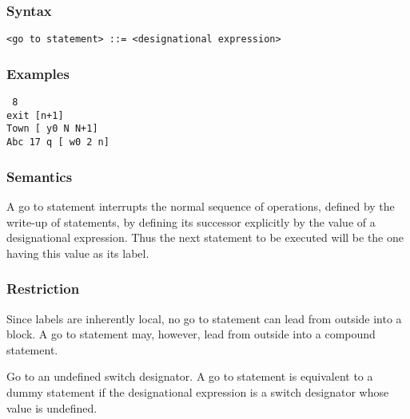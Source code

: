 \documentclass[a4paper,11pt]{article}
\begin{document}
\subsubsection{Syntax}
\label{LblGotoStatementsSyntax}

\begin{flushleft}
\vspace{0.2em}\texttt{<go to statement> ::=  <designational expression>}\\
\end{flushleft}


\subsubsection{Examples}

\begin{flushleft}
\texttt{ 8\\
 exit [n+1]\\
 Town [ y\mlt{}0  N  N+1]\\
  Ab\mlt{}c  17  q [ w\mlt{}0  2  n]}\\
\end{flushleft}

\subsubsection{Semantics}
\label{LblGotoStatementsSemantics}

A go to statement interrupts the normal sequence of operations,
defined by the write-up of statements, by defining its successor
explicitly by the value of a designational expression.  Thus the next
statement to be executed will be the one having this value as its
label.

\subsubsection{Restriction}

Since labels are inherently local, no go to statement can lead from
outside into a block.  A go to statement may, however, lead from
outside into a compound statement.

Go to an undefined switch designator.  A go to statement is equivalent
to a dummy statement if the designational expression is a switch
designator whose value is undefined.
\end{document}
